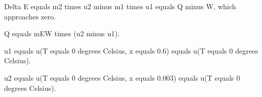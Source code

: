 Delta E equals m2 times u2 minus m1 times u1 equals Q minus W, which approaches zero.  

Q equals mEW times (u2 minus u1).  

u1 equals u(T equals 0 degrees Celsius, x equals 0.6) equals u(T equals 0 degrees Celsius).  

u2 equals u(T equals 0 degrees Celsius, x equals 0.003) equals u(T equals 0 degrees Celsius).